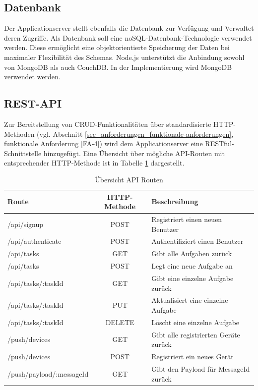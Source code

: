 \subsection{Datenbank}

Der Applicationserver stellt ebenfalls die Datenbank zur Verfügung und Verwaltet deren Zugriffe. Als Datenbank soll eine noSQL-Datenbank-Technologie verwendet werden. Diese ermöglicht eine objektorientierte Speicherung der Daten bei maximaler Flexibilität des Schemas. Node.js unterstützt die Anbindung sowohl von MongoDB als auch CouchDB. In der Implementierung wird MongoDB verwendet werden.

\subsection{REST-API}

Zur Bereitstellung von CRUD-Funktionalitäten über standardisierte HTTP-Methoden (vgl. Abschnitt \ref{sec_anforderungen_funktionale-anforderungen}, funktionale Anforderung [FA-4]) wird dem Applicationserver eine RESTful-Schnittstelle hinzugefügt. Eine Übersicht über mögliche API-Routen mit entsprechender HTTP-Methode ist in Tabelle \ref{tbl_konzeption_rest} dargestellt. 

\begin{table}[h]
\centering
\begin{tabular}{l | c | l }
    \textbf{Route} & \textbf{HTTP-Methode} & \textbf{Beschreibung} \\
    \hline\hline
    /api/signup & POST & Registriert einen neuen Benutzer \\
    /api/authenticate & POST & Authentifiziert einen Benutzer \\
    \hline
    /api/tasks & GET & Gibt alle Aufgaben zurück \\
    /api/tasks & POST & Legt eine neue Aufgabe an \\
    /api/tasks/:taskId & GET & Gibt eine einzelne Aufgabe zurück \\
    /api/tasks/:taskId & PUT & Aktualisiert eine einzelne Aufgabe \\
    /api/tasks/:taskId & DELETE & Löscht eine einzelne Aufgabe \\
    \hline
    /push/devices & GET & Gibt alle registrierten Geräte zurück \\
    /push/devices & POST & Registriert ein neues Gerät \\
    /push/payload/:messageId & GET & Gibt den Payload für MessageId zurück \\
\end{tabular}
\caption{Übersicht API Routen}
\label{tbl_konzeption_rest}
\end{table}

